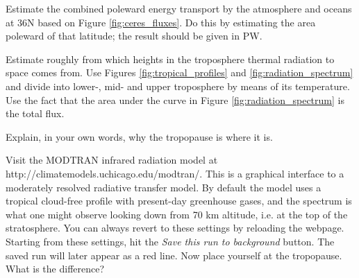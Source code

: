 \documentclass[12pt]{book}
\begin{document}
\newpage
\vspace{2 cm}
{\setlength{\parindent}{0cm}
\begin{exercise}
Estimate the combined poleward energy transport by the atmosphere and oceans at 36N based on Figure \ref{fig:ceres_fluxes}. Do this by estimating the area poleward of that latitude; the result should be given in PW.
\end{exercise}

\begin{exercise}
Estimate roughly from which heights in the troposphere thermal radiation to space comes from. Use Figures \ref{fig:tropical_profiles} and \ref{fig:radiation_spectrum} and divide into lower-, mid- and upper troposphere by means of its temperature. Use the fact that the area under the curve in Figure  \ref{fig:radiation_spectrum} is the total flux. %
\end{exercise}

\begin{exercise}
Explain, in your own words, why the tropopause is where it is.
\end{exercise}

\begin{exercise}
Visit the MODTRAN infrared radiation model at http://climatemodels.uchicago.edu/modtran/. This is a graphical interface to a moderately resolved radiative transfer model. By default the model uses a tropical cloud-free profile with present-day greenhouse gases, and the spectrum is what one might observe looking down from 70 km altitude, i.e. at the top of the stratosphere. You can always revert to these settings by reloading the webpage. Starting from these settings, hit the {\em Save this run to background} button. The saved run will later appear as a red line. Now place yourself at the tropopause. What is the difference?
\end{exercise}
}

%
%
%
%
%
% 
%
\end{document}
